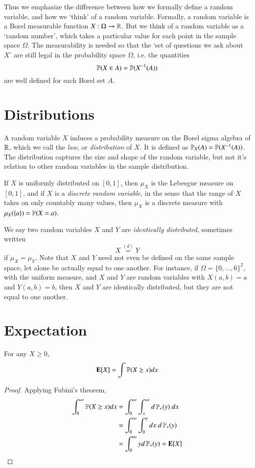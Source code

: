 Thus we emphasize the difference between how we formally define a random variable, and how we `think' of a random variable. Formally, a random variable is a Borel measurable function $X: \Omega \to \operatorname{\mathbb{R}}$. But we think of a random variable as a `random number', which takes a particular value for each point in the sample space $\Omega$. The measurability is needed so that the `set of questions we ask about $X$' are still legal in the probability space $\Omega$, i.e. the quantities
%
\[ \mathbb{P}(X \in A) = \mathbb{P}(X^{-1}(A)) \]
%
are well defined for each Borel set $A$.

\section{Distributions}

A random variable $X$ induces a probability measure on the Borel sigma algebra of $\operatorname{\mathbb{R}}$, which we call the \emph{law}, or \emph{distribution} of $X$. It is defined as $\mathbb{P}_X(A) = \mathbb{P}(X^{-1}(A))$. The distribution captures the size and shape of the random variable, but not it's relation to other random variables in the sample distribution.

If $X$ is uniformly distributed on $[0,1]$, then $\mu_X$ is the Lebesgue measure on $[0,1]$, and if $X$ is a \emph{discrete random variable}, in the sense that the range of $X$ takes on only countably many values, then $\mu_X$ is a discrete measure with $\mu_X(\{ a \}) = \operatorname{\mathbb{P}}(X = a)$.

We say two random variables $X$ and $Y$ are \emph{identically distributed}, sometimes written
%
\[ X \overset{(d)}{=} Y \]
%
if $\mu_X = \mu_Y$. Note that $X$ and $Y$ need not even be defined on the same sample space, let alone be actually equal to one another. For instance, if $\Omega = \{ 0, \dots, 6 \}^2$, with the uniform measure, and $X$ and $Y$ are random variables with $X(a,b) = a$ and $Y(a,b) = b$, then $X$ and $Y$ are identically distributed, but they are not equal to one another.

\section{Expectation}

\begin{theorem}
    For any $X \geq 0$,
    \[ \mathbf{E}[X] = \int \operatorname{\mathbb{P}}(X \geq x) dx \]
\end{theorem}
\begin{proof}
    Applying Fubini's theorem,
    \begin{align*}
        \int_0^\infty \operatorname{\mathbb{P}}(X \geq x) dx &= \int_0^\infty \int_x^\infty d \operatorname{\mathbb{P}}_*(y)\ dx\\
        &= \int_0^\infty \int_0^y dx\ d\operatorname{\mathbb{P}}_*(y)\\
        &= \int_0^\infty y d\operatorname{\mathbb{P}}_*(y) = \mathbf{E}[X]
    \end{align*}
\end{proof}

